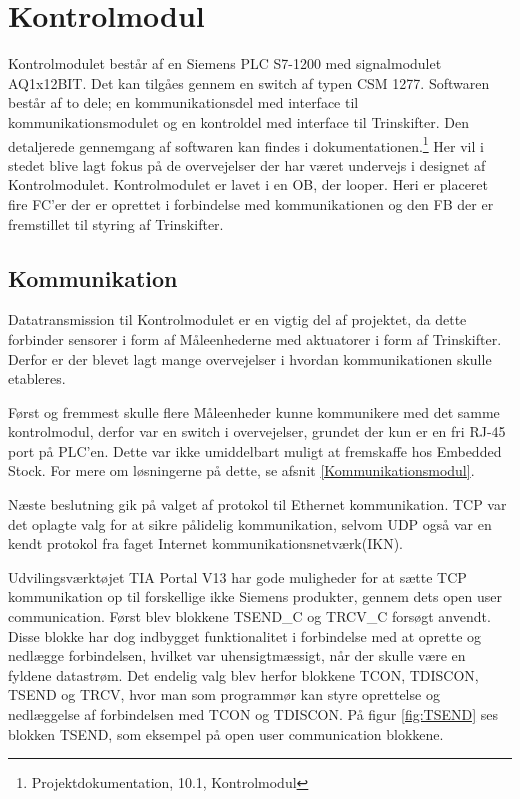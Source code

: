 
\section{Kontrolmodul}

Kontrolmodulet består af en Siemens PLC S7-1200 med signalmodulet AQ1x12BIT. Det kan tilgåes gennem en switch af typen CSM 1277.
Softwaren består af to dele; en kommunikationsdel med interface til kommunikationsmodulet og en kontroldel med interface til Trinskifter. Den detaljerede gennemgang af softwaren kan findes i dokumentationen.\footnote{Projektdokumentation, 10.1, Kontrolmodul} Her vil i stedet blive lagt fokus på de overvejelser der har været undervejs i designet af Kontrolmodulet.
Kontrolmodulet er lavet i en OB, der looper. Heri er placeret fire FC'er der er oprettet i forbindelse med kommunikationen og den FB der er fremstillet til styring af Trinskifter.

\subsection{Kommunikation}
Datatransmission til Kontrolmodulet er en vigtig del af projektet, da dette forbinder sensorer i form af Måleenhederne med aktuatorer i form af Trinskifter. Derfor er der blevet lagt mange overvejelser i hvordan kommunikationen skulle etableres.


Først og fremmest skulle flere Måleenheder kunne kommunikere med det samme kontrolmodul, derfor var en switch i overvejelser, grundet der kun er en fri RJ-45 port på PLC'en. Dette var ikke umiddelbart muligt at fremskaffe hos Embedded Stock. For mere om løsningerne på dette, se afsnit \ref{Kommunikationsmodul}.


Næste beslutning gik på valget af protokol til Ethernet kommunikation. TCP var det oplagte valg for at sikre pålidelig kommunikation, selvom UDP også var en kendt protokol fra faget Internet kommunikationsnetværk(IKN).


Udvilingsværktøjet TIA Portal V13 har gode muligheder for at sætte TCP kommunikation op til forskellige ikke Siemens produkter, gennem dets open user communication. Først blev blokkene TSEND\_C og TRCV\_C forsøgt anvendt. Disse blokke har dog indbygget funktionalitet i forbindelse med at oprette og nedlægge forbindelsen, hvilket var uhensigtmæssigt, når der skulle være en fyldene datastrøm. Det endelig valg blev herfor blokkene TCON, TDISCON, TSEND og TRCV, hvor man som programmør kan styre oprettelse og nedlæggelse af forbindelsen med TCON og TDISCON. På figur \ref{fig:TSEND} ses blokken TSEND, som eksempel på open user communication blokkene.

